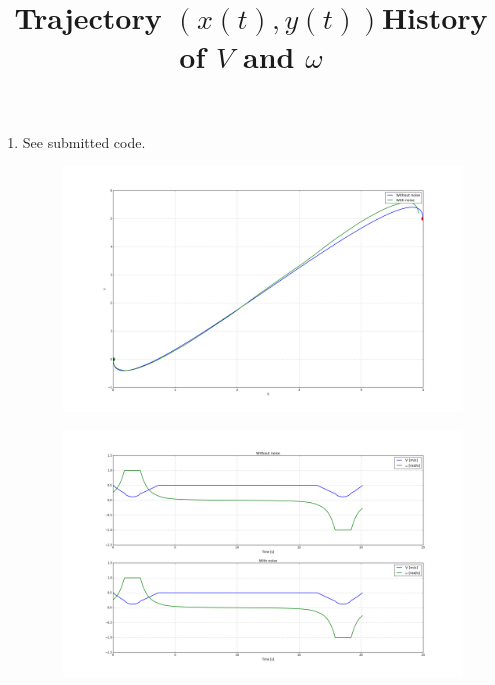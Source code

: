 \documentclass[12pt]{article}
\begin{document}
\begin{enumerate}
\begin{figure}[H]
		\end{figure}
	\item See submitted code.
	\begin{figure}[H]
		\centering
		\title{\bf Trajectory $(x(t), y(t))$}
		\includegraphics[width=\textwidth]{../Figures/hw1_2_v_traj.png}
	\end{figure}
	\begin{figure}[H]
		\centering
		\title{\bf History of $V$ and $\omega$}
		\includegraphics[width=\textwidth]{../Figures/hw1_2_v_ctrl.png}
	\end{figure}
\end{enumerate}
\end{document}
